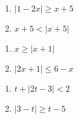 \documentclass{ximera}
\begin{document}
\begin{multicols}{2}
\begin{enumerate}
\setcounter{enumi}{\value{HW}}

\item $|1-2x| \geq x + 5$
\item  $x + 5 <  |x+5|$ 

\setcounter{HW}{\value{enumi}}
\end{enumerate}
\end{multicols}

\begin{multicols}{2}
\begin{enumerate}
\setcounter{enumi}{\value{HW}}

\item  $x \geq |x+1|$ 
\item   $|2x + 1| \leq 6-x$   

\setcounter{HW}{\value{enumi}}
\end{enumerate}
\end{multicols}

\begin{multicols}{2}
\begin{enumerate}
\setcounter{enumi}{\value{HW}}

\item  $t + |2t-3| < 2$  
\item  $|3-t| \geq t-5$  \label{solveinequabslast}

\setcounter{HW}{\value{enumi}}
\end{enumerate}
\end{multicols}
\end{document}
